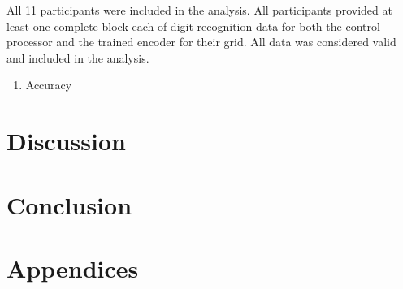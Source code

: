\documentclass[11pt]{article}
\begin{document}
All 11 participants were included in the analysis.
All participants provided at least one complete block each of digit recognition data for both the control processor and the trained encoder for their grid.
All data was considered valid and included in the analysis.

\begin{enumerate}
\item Accuracy
\label{sec:org1c1a8dd}
\end{enumerate}

\section{Discussion}
\label{sec:orga7551ed}
\section{Conclusion}
\label{sec:org964d9b1}
\section{Appendices}
\label{sec:orged50db3}
\clearpage



\end{document}
